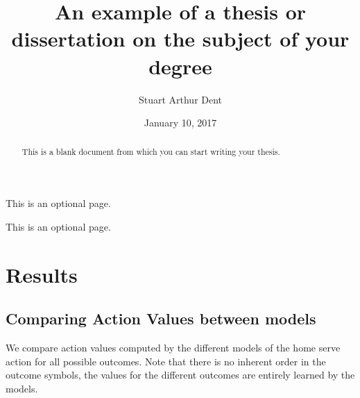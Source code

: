 \documentclass{sfuthesis}
\title{An example of a thesis or dissertation on the subject of your degree}
\author{Stuart Arthur Dent}
\date{January 10, 2017}
\begin{document}
\frontmatter
\maketitle{}
\makecommittee{}

\begin{abstract}
	This is a blank document from which you can start writing your thesis.
\end{abstract}


\begin{dedication}
	This is an optional page.
\end{dedication}


\begin{acknowledgements}
	This is an optional page.
\end{acknowledgements}

%
\tableofcontents%
\clearpage

%
\listoftables%
\clearpage

%
\listoffigures%
\clearpage





%
%

\mainmatter%



\chapter{Results}

\section{Comparing Action Values between models}

We compare action values computed by the different models of the home serve action for all possible outcomes. Note that there is no inherent order in the outcome symbols, the values for the different outcomes are entirely learned by the models.
\end{document}
